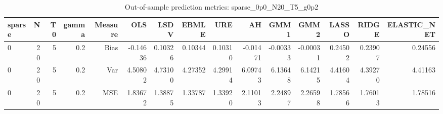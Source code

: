 \begin{table}[!htbp]\centering
\caption{Out-of-sample prediction metrics: sparse_0p0_N20_T5_g0p2}
\label{tab:table3_sparse_0p0_N20_T5_g0p2}
\begin{tabular}{lrrrrrrrrrrrrrr}
\hline
sparse & N & T0 & gamma & Measure & OLS & LSDV & EBMLE & URE & AH & GMM1 & GMM2 & LASSO & RIDGE & ELASTIC_NET \\
\hline
0 & 20 & 5 & 0.2 & Bias & -0.14636 & 0.10326 & 0.10344 & 0.10310 & -0.01471 & -0.00333 & -0.00031 & 0.24502 & 0.23907 & 0.24556 \\
0 & 20 & 5 & 0.2 & Var & 4.50802 & 4.73100 & 4.27352 & 4.29914 & 6.09743 & 6.13648 & 6.14215 & 4.41604 & 4.39270 & 4.41163 \\
0 & 20 & 5 & 0.2 & MSE & 1.83672 & 1.38875 & 1.33787 & 1.33920 & 2.11013 & 2.24897 & 2.26598 & 1.78566 & 1.76013 & 1.78516 \\
\hline
\end{tabular}
\end{table}

